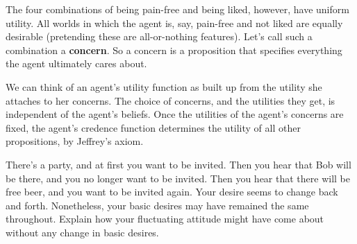The four combinations of being pain-free and being liked, however,
have uniform utility. All worlds in which the agent is, say, pain-free
and not liked are equally desirable (pretending these are
all-or-nothing features). Let's call such a combination a
\textbf{concern}. So a concern is a proposition that specifies
everything the agent ultimately cares about.

We can think of an agent's utility function as built up from the
utility she attaches to her concerns. The choice of concerns, and the
utilities they get, is independent of the agent's beliefs. Once the
utilities of the agent's concerns are fixed, the agent's credence
function determines the utility of all other propositions, by
Jeffrey's axiom.

\begin{exercise}{1}
  There's a party, and at first you want to be invited. Then you hear that Bob
  will be there, and you no longer want to be invited. Then you hear that
  there will be free beer, and you want to be invited again. Your desire seems
  to change back and forth. Nonetheless, your basic desires may have
  remained the same throughout. Explain how your fluctuating attitude
  might have come about without any change in basic desires.
\end{exercise}




